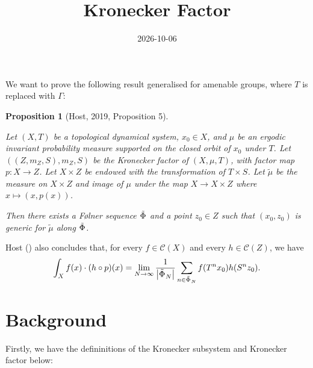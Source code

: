 \documentclass[
  british,
]{article}
\title{Kronecker Factor}
\author{}
\date{2026-10-06}
\theoremstyle{plain}
\newtheorem{proposition}{Proposition}[section]
\theoremstyle{definition}
\theoremstyle{plain}
\theoremstyle{remark}
\newcommand{\AmenableGroup}{{\Gamma}}
\newcommand{\ContinuousFunctionSpace}[1]{{\mathscr{C}({#1})}}
\newcommand{\CountingMeasure}[1]{{\left|#1\right|}}
\newcommand{\Folner}[1][\vphantom{}]{{\Phi}_{#1}}
\newcommand{\KroneckerFactorMap}{p}
\newcommand{\KroneckerMeasure}{{m_Z}}
\newcommand{\KroneckerSpace}{{Z}}
\newcommand{\KroneckerSpaceElement}{{z}}
\newcommand{\Measure}{{\mu}}
\newcommand{\ShiftSpace}{{X}}
\newcommand{\ShiftSpaceElement}{{x}}
\newcommand{\KroneckerFactor}{{(\KroneckerSpace,\KroneckerMeasure,S)}}
\begin{document}
\maketitle


We want to prove the following result generalised for amenable groups,
where \(T\) is replaced with \(\AmenableGroup\):

\begin{proposition}[{Host, 2019, Proposition
5}]\protect\hypertarget{prp-KroneckerGenericSource0}{}\label{prp-KroneckerGenericSource0}

Let \((\ShiftSpace,T)\) be a topological dynamical system,
\(\ShiftSpaceElement_0\in\ShiftSpace\), and \(\Measure\) be an ergodic
invariant probability measure supported on the closed orbit of
\(\ShiftSpaceElement_0\) under \(T\). Let
\((\KroneckerFactor,\KroneckerMeasure,S)\) be the Kronecker factor of
\((\ShiftSpace,\Measure,T)\), with factor map
\(\KroneckerFactorMap:\ShiftSpace\rightarrow\KroneckerSpace\). Let
\(\ShiftSpace\times\KroneckerSpace\) be endowed with the transformation
of \(T\times S\). Let \(\tilde\Measure\) be the measure on
\(\ShiftSpace\times\KroneckerSpace\) and image of \(\Measure\) under the
map \(\ShiftSpace\rightarrow\ShiftSpace\times\KroneckerSpace\) where
\(\ShiftSpaceElement\mapsto(\ShiftSpaceElement,\KroneckerFactorMap(\ShiftSpaceElement))\).

Then there exists a Følner sequence \(\tilde{\Folner}\) and a point
\(\KroneckerSpaceElement_0\in\KroneckerSpace\) such that
\((\ShiftSpaceElement_0,\KroneckerSpaceElement_0)\) is generic for
\(\tilde{\Measure}\) along \(\tilde{\Folner}\).

\end{proposition}

Host () also concludes that, for every
\(f\in\ContinuousFunctionSpace{X}\) and every
\(h\in\ContinuousFunctionSpace{Z}\), we have
\[\int_Xf(\ShiftSpaceElement)\cdot (h\circ\KroneckerFactorMap)(\ShiftSpaceElement)=\lim_{N\rightarrow\infty}\frac{1}{\CountingMeasure{\tilde{\Folner}_N}}\sum_{n\in\tilde{\Folner}_N}f(T^n\ShiftSpaceElement_0)h(S^n\KroneckerSpaceElement_0). \]

\section{Background}\label{background}

Firstly, we have the defininitions of the Kronecker subsystem and
Kronecker factor below:
\end{document}
